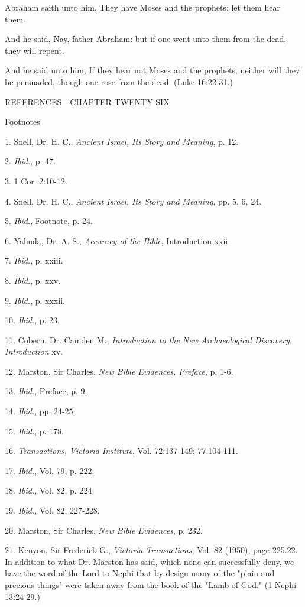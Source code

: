 Abraham saith unto him, They have Moses and the prophets; let them hear them.

And he said, Nay, father Abraham: but if one went unto them from the dead, they will repent.

And he said unto him, If they hear not Moses and the prophets, neither will they be
persuaded, though one rose from the dead. (Luke 16:22-31.)

\newpage
REFERENCES—CHAPTER TWENTY-SIX

Footnotes

1. Snell, Dr. H. C., \textit{Ancient Israel, Its Story and Meaning}, p. 12.

2. \textit{Ibid.}, p. 47.

3. 1 Cor. 2:10-12.

4. Snell, Dr. H. C., \textit{Ancient Israel, Its Story and Meaning}, pp. 5, 6, 24.

5. \textit{Ibid.}, Footnote, p. 24.

6. Yahuda, Dr. A. S., \textit{Accuracy of the Bible}, Introduction xxii

7. \textit{Ibid.}, p. xxiii.

8. \textit{Ibid.}, p. xxv.

9. \textit{Ibid.}, p. xxxii.

10. \textit{Ibid.}, p. 23.

11. Cobern, Dr. Camden M., \textit{Introduction to the New Archaeological Discovery, Introduction}
xv.

12. Marston, Sir Charles, \textit{New Bible Evidences, Preface}, p. 1-6.

13. \textit{Ibid.}, Preface, p. 9.

14. \textit{Ibid.}, pp. 24-25.

15. \textit{Ibid.}, p. 178.

16. \textit{Transactions, Victoria Institute}, Vol. 72:137-149; 77:104-111.

17. \textit{Ibid.}, Vol. 79, p. 222.

18. \textit{Ibid.}, Vol. 82, p. 224.

19. \textit{Ibid.}, Vol. 82, 227-228.

20. Marston, Sir Charles, \textit{New Bible Evidences}, p. 232.

21. Kenyon, Sir Frederick G., \textit{Victoria Transactions}, Vol. 82 (1950), page 225.22. In addition to what Dr. Marston has said, which none can successfully deny, we have the
word of the Lord to Nephi that by design many of the "plain and precious things" were taken
away from the book of the "Lamb of God." (1 Nephi 13:24-29.)

